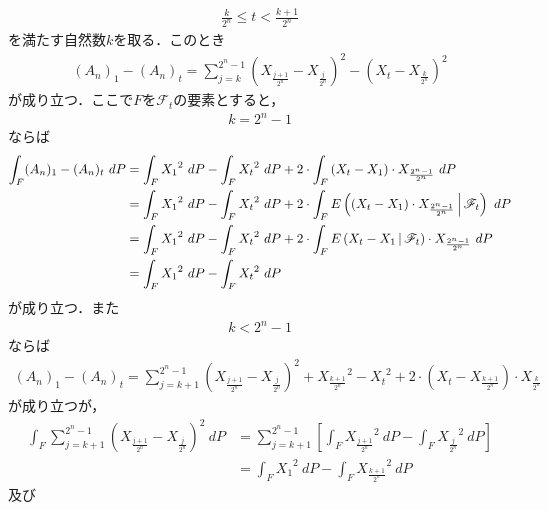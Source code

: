 \begin{sketch}
\begin{description}
				\begin{align}
					\frac{k}{2^{n}} \leq t < \frac{k+1}{2^{n}}
				\end{align}
				を満たす自然数$k$を取る．このとき
				\begin{align}
					(A_{n})_{1} - (A_{n})_{t}
					= \sum_{j=k}^{2^{n}-1} \left( X_{\frac{j+1}{2^{n}}} - X_{\frac{j}{2^{n}}} \right)^{2}
					- \left( X_{t} - X_{\frac{k}{2^{n}}} \right)^{2}
				\end{align}
				が成り立つ．ここで$F$を$\mathscr{F}_{t}$の要素とすると，
				\begin{align}
					k = 2^{n} - 1
				\end{align}
				ならば
				\begin{align}
					\int_{F} (A_{n})_{1} - (A_{n})_{t}\ dP
					&= \int_{F} {X_{1}}^{2}\ dP - \int_{F} {X_{t}}^{2}\ dP 
					+ 2 \cdot \int_{F} \left(X_{t} - X_{1}\right) \cdot X_{\frac{2^{n}-1}{2^{n}}}\ dP \\
					&= \int_{F} {X_{1}}^{2}\ dP - \int_{F} {X_{t}}^{2}\ dP
					+ 2 \cdot \int_{F} E\left( \left(X_{t} - X_{1}\right) \cdot X_{\frac{2^{n}-1}{2^{n}}} \, \middle|\, \mathscr{F}_{t} \right)\ dP \\
					&= \int_{F} {X_{1}}^{2}\ dP - \int_{F} {X_{t}}^{2}\ dP
					+ 2 \cdot \int_{F} E\left( X_{t} - X_{1} \, \middle|\, \mathscr{F}_{t} \right) \cdot X_{\frac{2^{n}-1}{2^{n}}}\ dP \\
					&= \int_{F} {X_{1}}^{2}\ dP - \int_{F} {X_{t}}^{2}\ dP
				\end{align}
				が成り立つ．また
				\begin{align}
					k < 2^{n} - 1
				\end{align}
				ならば
				\begin{align}
					(A_{n})_{1} - (A_{n})_{t}
					= \sum_{j=k+1}^{2^{n}-1} \left( X_{\frac{j+1}{2^{n}}} - X_{\frac{j}{2^{n}}} \right)^{2}
					+ {X_{\frac{k+1}{2^{n}}}}^{2} - {X_{t}}^{2}
					+ 2 \cdot \left( X_{t} - X_{\frac{k+1}{2^{n}}} \right) \cdot X_{\frac{k}{2^{n}}}
				\end{align}
				が成り立つが，
				\begin{align}
					\int_{F} \sum_{j=k+1}^{2^{n}-1} \left( X_{\frac{j+1}{2^{n}}} - X_{\frac{j}{2^{n}}} \right)^{2}\ dP
					&= \sum_{j=k+1}^{2^{n}-1} \left[\int_{F} {X_{\frac{j+1}{2^{n}}}}^{2}\ dP
					- \int_{F} {X_{\frac{j}{2^{n}}}}^{2}\ dP\right] \\
					&= \int_{F} {X_{1}}^{2}\ dP - \int_{F} {X_{\frac{k+1}{2^{n}}}}^{2}\ dP
				\end{align}
				及び
				\begin{align}

\end{align}
\end{description}
\end{sketch}
